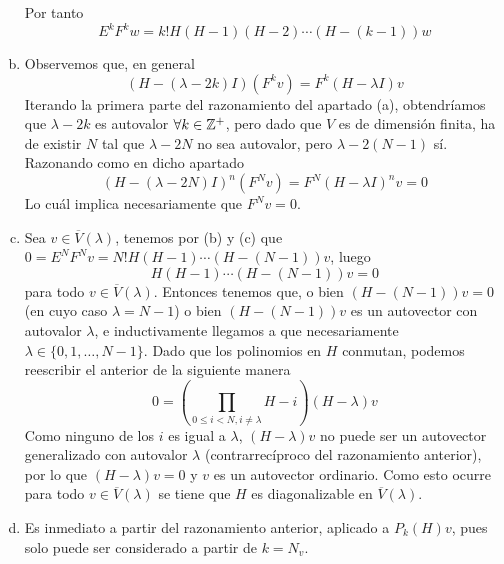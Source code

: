 \documentclass[twoside]{article}
\begin{document}
\begin{solucion}
\begin{enumerate}[(a)]
Por tanto
\[
E^kF^kw=k!H(H-1)(H-2)\cdots (H-(k-1))w
\]

\item Observemos que, en general
\[
(H - (\lambda - 2k)I)(F^k v) = F^k(H - \lambda I)v
\]
Iterando la primera parte del razonamiento del apartado (a), obtendríamos que $\lambda-2k$ es autovalor $\forall k \in \mathbb{Z}^+$, pero dado que $V$ es de dimensión finita, ha de existir $N$ tal que $\lambda -2N$ no sea autovalor, pero $\lambda - 2(N-1)$ sí. Razonando como en dicho apartado
$$
(H-(\lambda - 2N)I)^n(F^Nv) = F^N (H-\lambda I)^nv = 0 
$$
Lo cuál implica necesariamente que $F^N v= 0$.
\item Sea $v\in\overline{V}(\lambda)$, tenemos por (b) y (c)	 que $0=E^NF^Nv=N! H(H-1)\cdots (H-(N-1))v$, luego $$H(H-1)\cdots (H-(N-1))v=0$$
para todo $v\in\overline{V}(\lambda)$. Entonces tenemos que, o bien $(H-(N-1))v=0$ (en cuyo caso $\lambda=N-1$) o bien $(H-(N-1))v$ es un autovector con autovalor $\lambda$, e inductivamente llegamos a que necesariamente $\lambda\in\{0,1,\dots, N-1\}$. Dado que los polinomios en $H$ conmutan, podemos reescribir el anterior de la siguiente manera
\[
0 = \left(\prod_{0 \leq i < N, i \neq \lambda} H-i\right) (H-\lambda)v
\]
Como ninguno de los $i$ es igual a $\lambda$, $(H-\lambda)v$ no puede ser un autovector generalizado con autovalor $\lambda$ (contrarrecíproco del razonamiento anterior), por lo que $(H-\lambda)v=0$ y $v$ es un autovector ordinario. Como esto ocurre para todo $v\in\overline{V}(\lambda)$ se tiene que $H$ es diagonalizable en $\overline{V}(\lambda)$. 

\item Es inmediato a partir del razonamiento anterior, aplicado a $P_k(H)v$, pues solo puede ser considerado a partir de $k=N_v$.


\end{enumerate}
\end{solucion}
\end{document}

